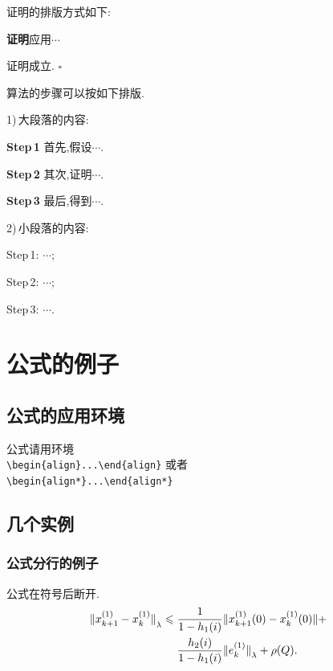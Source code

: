 \documentclass{ctacn}%
\begin{document}
\begin{multicols}{2}



证明的排版方式如下:

\textbf{证明}\quad 应用$\cdots$

证明成立. {\Large$\square$}

算法的步骤可以按如下排版.

1)\,大段落的内容:

\textbf{Step\,1}\quad
首先,假设$\cdots$.

\textbf{Step\,2}\quad
其次,证明$\cdots$.

\textbf{Step\,3}\quad
最后,得到$\cdots$.

2)\,小段落的内容:

Step\,1: $\cdots$;

Step\,2: $\cdots$;

Step\,3: $\cdots$.


\section{公式的例子}
\subsection{公式的应用环境}
公式请用环境\\
\verb|\begin{align}...\end{align}|
或者\\
\verb|\begin{align*}...\end{align*}|%
\subsection{几个实例}

\subsubsection{公式分行的例子}
公式在符号后断开.
\begin{align}
{\Arrowvert x^{(1)}_{k+1}-x^{(1)}_k\Arrowvert}_\lambda\leqslant \;&
\frac{1}{1-h_1(i)}\Arrowvert x^{(1)}_{k+1}(0)-x^{(1)}_k(0)\Arrowvert+\notag\\
&\frac{h_2(i)}{1-h_1(i)}{\Arrowvert
	e^{(1)}_k\Arrowvert}_\lambda+\rho(Q).
\end{align}



\end{multicols}
\end{document}
